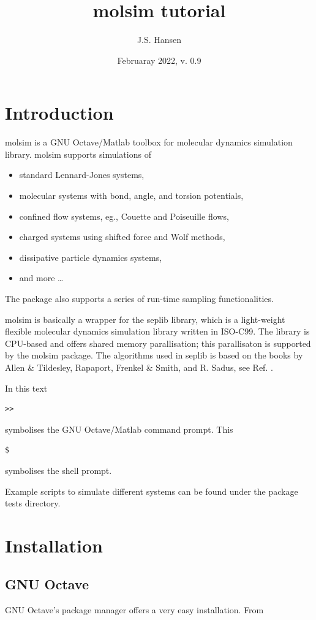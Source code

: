 \documentclass[11pt]{article}
\title{\textsf{molsim} tutorial}
\author{J.S. Hansen}
\date{Februaray 2022, v. 0.9}
\begin{document}
\maketitle

\section{Introduction}

\textsf{molsim} is a GNU Octave/Matlab toolbox for molecular dynamics simulation
library. \textsf{molsim} supports simulations of
\begin{itemize}
\item standard Lennard-Jones systems,
\item molecular systems with bond, angle, and torsion potentials, 
\item confined flow systems, eg., Couette and Poiseuille flows,
\item charged systems using shifted force and Wolf methods,
\item dissipative particle dynamics systems,
\item and more \ldots
\end{itemize}
The package also supports a series of run-time sampling functionalities.

\bigskip
\noindent \textsf{molsim} is basically a wrapper for the \textsf{seplib}
library, which is a light-weight flexible molecular dynamics simulation library
written in ISO-C99. The library is CPU-based and offers shared memory
parallisation; this parallisaton is supported by the \textsf{molsim}
package. The algorithms used in \textsf{seplib} is based on the books by Allen
\& Tildesley, Rapaport, Frenkel \& Smith, and R. Sadus, see
Ref. \cite{seplib:books}.

\bigskip
\noindent In this text
\begin{verbatim}
>> 
\end{verbatim}
symbolises the GNU Octave/Matlab command prompt. This 
\begin{verbatim}
$ 
\end{verbatim}
symbolises the shell prompt.

\bigskip
\noindent Example scripts to simulate different systems can be found under the
package \textsf{tests} directory.

\section{Installation}
\subsection{GNU Octave}
GNU Octave's package manager offers a very easy installation. From
\end{document}
